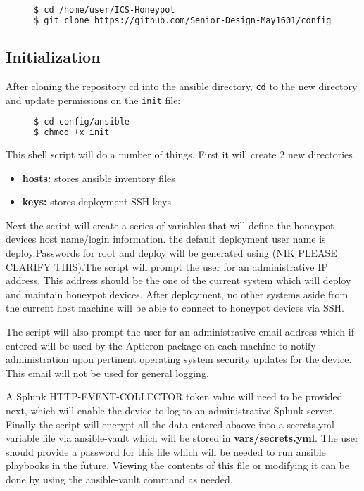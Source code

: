 \begin{figure}[H]
\small
\begin{lstlisting}[language=Bash,frame=single]
$ cd /home/user/ICS-Honeypot
$ git clone https://github.com/Senior-Design-May1601/config
\end{lstlisting}
\end{figure}

\subsection{Initialization}
After cloning the repository cd into the ansible directory, \texttt{cd} to the
new directory and update permissions on the \texttt{init} file:

\begin{figure}[H]
\small
\begin{lstlisting}[language=Bash,frame=single]
$ cd config/ansible
$ chmod +x init
\end{lstlisting}
\end{figure}

This shell script will do a number of things. First it will create 2 new directories
\begin{itemize}
\item \textbf{hosts:} stores ansible inventory files
\item \textbf{keys:} stores deployment SSH keys
\end{itemize}
Next the script will create a series of variables that will define the honeypot devices host name/login information. the default deployment user name is deploy.Passwords for root and deploy will be generated using (NIK PLEASE CLARIFY THIS).The script will prompt the user for an administrative IP address. This address should be the one of the current system which will deploy and maintain honeypot devices. After deployment, no other systems aside from the current host machine will be able to connect to honeypot devices via SSH.

The script will also prompt the user for an administrative email address which if entered will be used by the Apticron package on each machine to notify administration upon pertinent operating system security updates for the device. This email will not be used for general logging.

A Splunk HTTP-EVENT-COLLECTOR token value will need to be provided next, which will enable the device to log to an administrative Splunk server. Finally the script will encrypt all the data entered abaove into a secrets.yml variable file via ansible-vault which will be stored in \textbf{vars/secrets.yml}. The user should provide a password for this file which will be needed to run ansible playbooks in the future. Viewing the contents of this file or modifying it can be done by using the ansible-vault command as needed.


